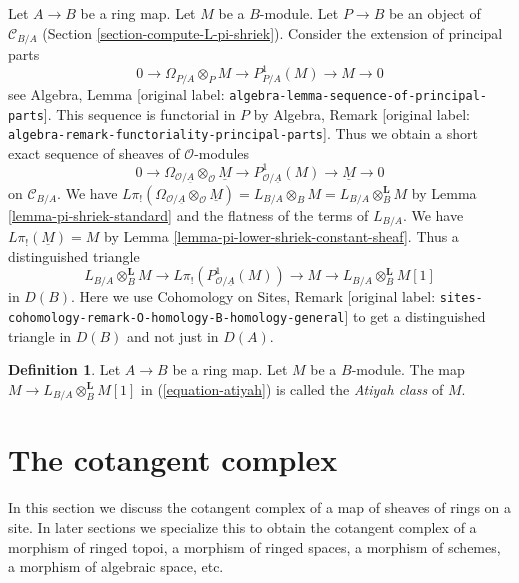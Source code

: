 \documentclass[10pt,a4paper]{article}
\theoremstyle{plain}
\theoremstyle{definition}
\newtheorem{definition}[subsection]{Definition}
\theoremstyle{remark}
\numberwithin{equation}{subsection}
\begin{document}
\noindent
Let $A \to B$ be a ring map. Let $M$ be a $B$-module.
Let $P \to B$ be an object of $\mathcal{C}_{B/A}$
(Section \ref{section-compute-L-pi-shriek}).
Consider the extension of principal parts
$$
0 \to \Omega_{P/A} \otimes_P M \to P^1_{P/A}(M) \to M \to 0
$$
see Algebra, Lemma \textnormal{[original label: \nolinkurl{algebra-lemma-sequence-of-principal-parts}]}.
This sequence is functorial in $P$ by
Algebra, Remark \textnormal{[original label: \nolinkurl{algebra-remark-functoriality-principal-parts}]}.
Thus we obtain a short exact sequence of sheaves of $\mathcal{O}$-modules
$$
0 \to \Omega_{\mathcal{O}/\underline{A}} \otimes_\mathcal{O} \underline{M} \to
P^1_{\mathcal{O}/\underline{A}}(M) \to \underline{M} \to 0
$$
on $\mathcal{C}_{B/A}$. We have
$L\pi_!(\Omega_{\mathcal{O}/\underline{A}} \otimes_\mathcal{O} \underline{M})
= L_{B/A} \otimes_B M = L_{B/A} \otimes_B^\mathbf{L} M$
by Lemma \ref{lemma-pi-shriek-standard} and the flatness of
the terms of $L_{B/A}$.
We have $L\pi_!(\underline{M}) = M$ by
Lemma \ref{lemma-pi-lower-shriek-constant-sheaf}.
Thus a distinguished triangle
\begin{equation}
\label{equation-atiyah}
L_{B/A} \otimes_B^\mathbf{L} M \to
L\pi_!\left(P^1_{\mathcal{O}/\underline{A}}(M)\right) \to M
\to L_{B/A} \otimes_B^\mathbf{L} M [1]
\end{equation}
in $D(B)$. Here we use Cohomology on Sites, Remark
\textnormal{[original label: \nolinkurl{sites-cohomology-remark-O-homology-B-homology-general}]}
to get a distinguished triangle in $D(B)$ and not just in $D(A)$.

\begin{definition}
\label{definition-atiyah-class}
Let $A \to B$ be a ring map. Let $M$ be a $B$-module.
The map $M \to L_{B/A} \otimes_B^\mathbf{L} M[1]$
in (\ref{equation-atiyah}) is called the {\it Atiyah class} of $M$.
\end{definition}




\section{The cotangent complex}
\label{section-cotangent-complex}

\noindent
In this section we discuss the cotangent complex of a map of sheaves
of rings on a site. In later sections we specialize this to obtain
the cotangent complex of a morphism of ringed topoi, a morphism of
ringed spaces, a morphism of schemes, a morphism of algebraic space, etc.
\end{document}
